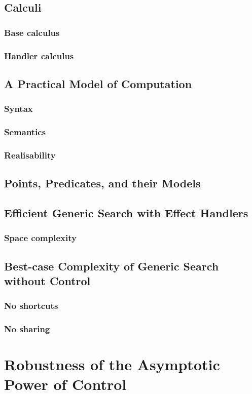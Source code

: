 \documentclass[11pt,phd,lfcs,twoside,openright,logo,leftchapter,normalheadings]{infthesis}
\begin{document}
\section{Calculi}
\subsection{Base calculus}
\subsection{Handler calculus}
\section{A Practical Model of Computation}
\subsection{Syntax}
\subsection{Semantics}
\subsection{Realisability}
\section{Points, Predicates, and their Models}
\section{Efficient Generic Search with Effect Handlers}
\subsection{Space complexity}
\section{Best-case Complexity of Generic Search without Control}
\subsection{No shortcuts}
\subsection{No sharing}

\chapter{Robustness of the Asymptotic Power of Control}
\end{document}
